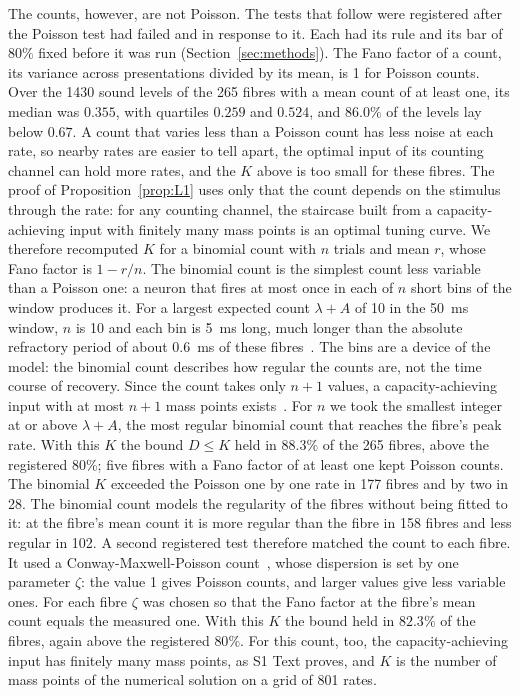 The counts, however, are not Poisson. The tests that follow were registered after the Poisson test had failed and in response to
it. Each had its rule and its bar of $80\%$ fixed before it was run (Section~\ref{sec:methods}). The Fano factor of a count, its variance across presentations divided by its mean, is 1 for
Poisson counts. Over the 1430 sound levels of the 265 fibres with a mean count of at least one, its median was $0.355$, with
quartiles $0.259$ and $0.524$, and $86.0\%$ of the levels lay below $0.67$. A count that varies less than a Poisson count has less
noise at each rate, so nearby rates are easier to tell apart, the optimal input of its counting channel can hold more rates, and the
$K$ above is too small for these fibres. The proof of Proposition~\ref{prop:L1} uses only that the count depends on the stimulus through the rate: for any counting
channel, the staircase built from a capacity-achieving input with finitely many mass points is an optimal tuning curve. We therefore
recomputed $K$ for a binomial count with $n$ trials and mean $r$, whose Fano factor is $1-r/n$. The binomial count is the simplest
count less variable than a Poisson one: a neuron that fires at most once in each of $n$ short bins of the window produces it. For a largest expected count $\lambda+A$ of 10 in the 50~ms window,
$n$ is 10 and each bin is 5~ms long, much longer than the absolute refractory period of about 0.6~ms of these fibres~\cite{Heeringa2024}.
The bins are a device of the model: the binomial count describes how regular the counts are, not the time course of recovery. Since the count takes only $n+1$
values, a capacity-achieving input with at most $n+1$ mass points exists~\cite{Favano2026}. For $n$ we took the smallest integer at
or above $\lambda+A$, the most regular binomial count that reaches the fibre's peak rate. With this $K$ the bound $D\le K$ held in
$88.3\%$ of the 265 fibres, above the registered $80\%$; five fibres with a Fano factor of at least one kept Poisson counts. The binomial $K$
exceeded the Poisson one by one rate in 177 fibres and by two in 28. The binomial count models the regularity of the fibres without
being fitted to it: at the fibre's mean count it is more regular than the fibre in 158 fibres and less regular in 102. A second
registered test therefore matched the count to each fibre. It used a Conway-Maxwell-Poisson count~\cite{Shmueli2005}, whose dispersion is set by one
parameter $\zeta$: the value 1 gives Poisson counts, and larger values give less variable ones. For each fibre $\zeta$ was chosen so
that the Fano factor at the fibre's mean count equals the measured one. With this $K$ the bound held in $82.3\%$ of the fibres, again
above the registered $80\%$. For this count, too, the capacity-achieving input has finitely many mass points, as S1 Text proves, and
$K$ is the number of mass points of the numerical solution on a grid of 801 rates.

